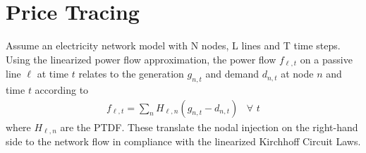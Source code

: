 \documentclass[11pt,twocolumn]{article}
\newcommand{\Forall}[1]{\hspace{10pt} \forall \,\, #1 }
\newcommand{\nodalgeneration}[1][n]{g_{#1,t}}
\newcommand{\flow}{f_{\ell,t}}
\newcommand{\demand}[1][n]{d_{#1,t}}
\newcommand{\ptdf}[1][n]{H_{\ell,#1}}
\begin{document}
\section{Price Tracing}
\label{sec:price_tracing}

Assume an electricity network model with N nodes, L lines and T time steps. Using the linearized power flow approximation, the power flow $\flow$ on a passive line $\ell$ at time $t$ relates to the generation $\nodalgeneration$ and demand $\demand$ at node $n$ and time $t$ according to 
\begin{align}
    \flow = \sum_n \ptdf \left(\nodalgeneration - \demand \right) \Forall{t}
\end{align}
where $\ptdf$ are the \ac{PTDF}. These translate the nodal injection on the right-hand side to the network flow in compliance with the linearized Kirchhoff Circuit Laws. 
\end{document}
